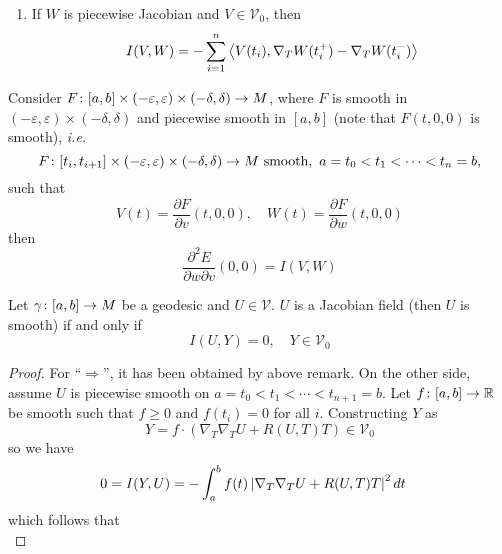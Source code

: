 \begin{enumerate}[label=\arabic{*}.]
\begin{rmk}
\begin{enumerate}[label=(\roman{*})]
			\item If $W$ is piecewise Jacobian and $V \in \mathcal{V}_0$, then
			\begin{equation*}
				I(V,W) = -\sum_{i=1}^{n} \left\langle V(t_i),\nabla_TW(t_{i}^+)-\nabla_TW(t_{i}^-) \right\rangle
			\end{equation*}
		\end{enumerate}
	\end{rmk}
	Consider $F \colon [a,b] \times (-\varepsilon,\varepsilon) \times (-\delta,\delta) \rightarrow M$, where $F$ is smooth in $(-\varepsilon,\varepsilon) \times (-\delta,\delta)$ and piecewise smooth in $[a,b]$ (note that $F(t,0,0)$ is smooth), \emph{i.e.}
	\begin{equation*}
		F \colon [t_i,t_{i+1}]\times (-\varepsilon,\varepsilon) \times (-\delta,\delta) \rightarrow M \text{ smooth},~a=t_0 < t_1 < \cdots < t_n = b,
	\end{equation*}
	such that 
	\begin{equation*}
		V(t) = \frac{\partial F}{\partial v}(t,0,0),\quad W(t) = \frac{\partial F}{\partial w}(t,0,0)
	\end{equation*}
	then
	\begin{equation*}
		\frac{\partial^2E}{\partial w\partial v}(0,0)  = I(V,W)
	\end{equation*}
	\begin{prop}
		Let $\gamma \colon [a,b] \rightarrow M$ be a geodesic and $U \in \mathcal{V}$. $U$ is a Jacobian field (then $U$ is smooth) if and only if
		\begin{equation*}
			I(U,Y) = 0,\quad Y \in \mathcal{V}_0
		\end{equation*}
	\end{prop}
	\begin{proof}
		For ``$\Rightarrow$'', it has been obtained by above remark. On the other side, assume $U$ is piecewise smooth on $a=t_0 < t_1 < \cdots < t_{n+1} = b$. Let $f \colon [a,b] \rightarrow \mathbb{R}$ be smooth such that $f \geq 0$ and $f(t_i) = 0$ for all $i$. Constructing $Y$ as
		\begin{equation*}
			Y = f\cdot(\nabla_T\nabla_TU + R(U,T)T) \in \mathcal{V}_0
		\end{equation*}
		so we have
		\begin{equation*}
			\begin{aligned}
			 	0 = I(Y,U) &= -\int_a^bf(t)\left\lvert\nabla_T\nabla_TU + R(U,T)T\right\lvert^2dt
			\end{aligned} 
		\end{equation*}
		which follows that
		\begin{equation*}

\end{equation*}
\end{proof}
\end{enumerate}
